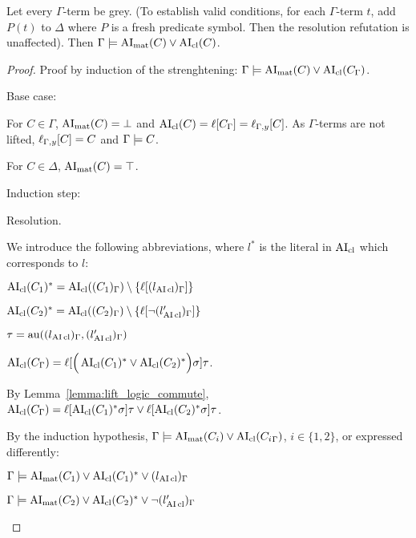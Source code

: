 \documentclass[,%
	paper=a4,%
	DIV12, %
	twoside=false,%
	liststotoc,
	bibtotoc,
	draft=false,%
	numbers=noendperiod
]{scrartcl}
\begin{document}
\begin{lemma}
	Let every $\Gamma$-term be grey. (To establish valid conditions, for each $\Gamma$-term $t$, add $P(t)$ to $\Delta$ where $P$ is a fresh predicate symbol. Then the resolution refutation is unaffected).
  Then
  $\Gamma \models \operatorname{AI}_\mathrm{mat}(C) \lor \operatorname{AI}_\mathrm{cl}(C)$.
\end{lemma}
\begin{proof}
  Proof by induction of the strenghtening:
  $\Gamma \models \operatorname{AI}_\mathrm{mat}(C) \lor \operatorname{AI}_\mathrm{cl}(C_\Gamma)$.

  Base case:

	For $C \in \Gamma$, $\operatorname{AI}_\mathrm{mat}(C) = \bot$ and $\operatorname{AI}_\mathrm{cl}(C) = \ell[C_\Gamma] = \ell_{\Gamma,y}[C]$. As $\Gamma$-terms are not lifted, $\ell_{\Gamma,y}[C] = C$ and $\Gamma \models C$.

  For $C \in \Delta$, $\operatorname{AI}_\mathrm{mat}(C) = \top$.

  Induction step:


  \begin{description}
    \item{Resolution.}
      \begin{prooftree}
			\end{prooftree}
			We introduce the following abbreviations, where $l^*$ is the literal in $\operatorname{AI}_\mathrm{cl}$ which corresponds to $l$:

			$ \operatorname{AI}_\mathrm{cl}(C_1)^* = \operatorname{AI}_\mathrm{cl}((C_1)_\Gamma) \setminus \{\ell[(l{_{\operatorname{AI}\mathrm{cl}}})_\Gamma]\}$

			$ \operatorname{AI}_\mathrm{cl}(C_2)^* = \operatorname{AI}_\mathrm{cl}((C_2)_\Gamma)\setminus \{\ell[\lnot (l{_{\operatorname{AI}\mathrm{cl}}'})_\Gamma]\}$

			$\tau  = \operatorname{au}((l{_{\operatorname{AI}\mathrm{cl}}})_\Gamma, (l{_{\operatorname{AI}\mathrm{cl}}'})_\Gamma)$

			$\operatorname{AI}_\mathrm{cl}(C_\Gamma) =
			\ell[\Big( \operatorname{AI}_\mathrm{cl}(C_1)^* \lor \operatorname{AI}_\mathrm{cl}(C_2)^* \Big)\sigma] \tau$.

			By Lemma~\ref{lemma:lift_logic_commute},
			$\operatorname{AI}_\mathrm{cl}(C_\Gamma) =
			\ell[\operatorname{AI}_\mathrm{cl}(C_1)^*\sigma]\tau \lor \ell[\operatorname{AI}_\mathrm{cl}(C_2)^*\sigma] \tau$.

			By the induction hypothesis,
			$\Gamma \models \operatorname{AI}_\mathrm{mat}(C_i) \lor \operatorname{AI}_\mathrm{cl}({C_i}_\Gamma)$, $i\in\{1,2\}$, or expressed differently:


			$\Gamma \models \operatorname{AI}_\mathrm{mat}(C_1) \lor \operatorname{AI}_\mathrm{cl}(C_1)^* \lor {(l{\ensuremath{_{\operatorname{AI}\mathrm{cl}}}})_\Gamma}$

			$\Gamma \models \operatorname{AI}_\mathrm{mat}(C_2) \lor \operatorname{AI}_\mathrm{cl}(C_2)^* \lor {\lnot (l{\ensuremath{_{\operatorname{AI}\mathrm{cl}}}'})_\Gamma}$


\end{description}
\end{proof}
\end{document}
